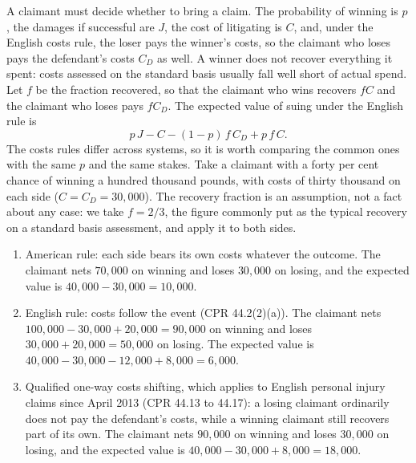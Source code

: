 A claimant must decide whether to bring a claim. The probability of winning is $p$, the damages if successful are $J$, the cost of litigating is $C$, and, under the English costs rule, the loser pays the winner's costs, so the claimant who loses pays the defendant's costs $C_D$ as well. A winner does not recover everything it spent: costs assessed on the standard basis usually fall well short of actual spend. Let $f$ be the fraction recovered, so that the claimant who wins recovers $fC$ and the claimant who loses pays $fC_D$. The expected value of suing under the English rule is
\begin{equation}
p\,J - C - (1-p)\,f\,C_D + p\,f\,C.
\end{equation}
The costs rules differ across systems, so it is worth comparing the common ones with the same $p$ and the same stakes. Take a claimant with a forty per cent chance of winning a hundred thousand pounds, with costs of thirty thousand on each side ($C = C_D = 30{,}000$). The recovery fraction is an assumption, not a fact about any case: we take $f = 2/3$, the figure commonly put as the typical recovery on a standard basis assessment, and apply it to both sides.

\begin{enumerate}[label=(\alph*)]
\item American rule: each side bears its own costs whatever the outcome. The claimant nets $70{,}000$ on winning and loses $30{,}000$ on losing, and the expected value is $40{,}000 - 30{,}000 = 10{,}000$.
\item English rule: costs follow the event (CPR 44.2(2)(a)). The claimant nets $100{,}000 - 30{,}000 + 20{,}000 = 90{,}000$ on winning and loses $30{,}000 + 20{,}000 = 50{,}000$ on losing. The expected value is $40{,}000 - 30{,}000 - 12{,}000 + 8{,}000 = 6{,}000$.
\item Qualified one-way costs shifting, which applies to English personal injury claims since April 2013 (CPR 44.13 to 44.17): a losing claimant ordinarily does not pay the defendant's costs, while a winning claimant still recovers part of its own. The claimant nets $90{,}000$ on winning and loses $30{,}000$ on losing, and the expected value is $40{,}000 - 30{,}000 + 8{,}000 = 18{,}000$.
\end{enumerate}

